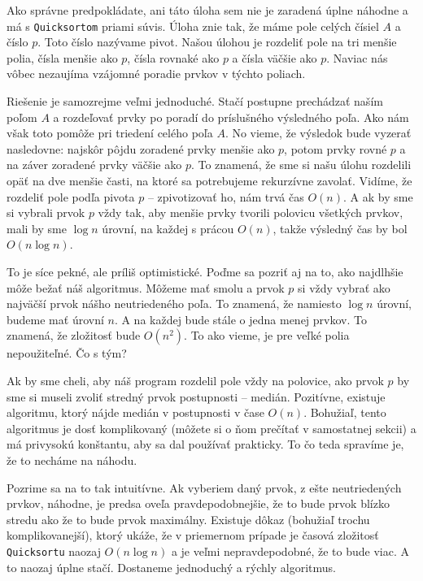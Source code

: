 Ako správne predpokládate, ani táto úloha sem nie je zaradená úplne náhodne a má s
\texttt{Quicksortom} priami súvis. Úloha znie tak, že máme pole celých čísiel $A$ a číslo $p$. Toto
číslo nazývame pivot. Našou úlohou je rozdeliť pole na tri menšie polia, čísla menšie ako $p$, čísla
rovnaké ako $p$ a čísla väčšie ako $p$. Naviac nás vôbec nezaujíma vzájomné poradie prvkov v týchto
poliach.

Riešenie je samozrejme veľmi jednoduché. Stačí postupne prechádzať naším poľom $A$ a rozdeľovať
prvky po poradí do príslušného výsledného poľa. Ako nám však toto pomôže pri triedení celého poľa
$A$. No vieme, že výsledok bude vyzerať nasledovne: najskôr pôjdu zoradené prvky menšie ako $p$,
potom prvky rovné $p$ a na záver zoradené prvky väčšie ako $p$. To znamená, že sme si našu úlohu
rozdelili opäť na dve menšie časti, na ktoré sa potrebujeme rekurzívne zavolať. Vidíme, že rozdeliť
pole podľa pivota $p$ -- zpivotizovať ho, nám trvá čas $O(n)$. A ak by sme si vybrali prvok $p$ vždy
tak, aby menšie prvky tvorili polovicu všetkých prvkov, mali by sme $\log n$ úrovní, na každej s
prácou $O(n)$, takže výsledný čas by bol $O(n \log n)$.

To je síce pekné, ale príliš optimistické. Poďme sa pozriť aj na to, ako najdlhšie môže bežať náš
algoritmus. Môžeme mať smolu a prvok $p$ si vždy vybrať ako najväčší prvok nášho neutriedeného poľa.
To znamená, že namiesto $\log n$ úrovní, budeme mať úrovní $n$. A na každej bude stále o jedna menej
prvkov. To znamená, že zložitosť bude $O(n^2)$. To ako vieme, je pre veľké polia nepoužiteľné. Čo s
tým?

Ak by sme cheli, aby náš program rozdelil pole vždy na polovice, ako prvok $p$ by sme si museli
zvoliť stredný prvok postupnosti -- medián. Pozitívne, existuje algoritmu, ktorý nájde medián v
postupnosti v čase $O(n)$. Bohužiaľ, tento algoritmus je dosť komplikovaný (môžete si o ňom prečítať
v samostatnej sekcii) a má privysokú konštantu, aby sa dal používať prakticky. To čo teda spravíme
je, že to necháme na náhodu.

Pozrime sa na to tak intuitívne. Ak vyberiem daný prvok, z ešte neutriedených prvkov, náhodne, je
predsa oveľa pravdepodobnejšie, že to bude prvok blízko stredu ako že to bude prvok maximálny.
Existuje dôkaz (bohužiaľ trochu komplikovanejší), ktorý ukáže, že v priemernom prípade je časová
zložitosť \texttt{Quicksortu} naozaj $O(n \log n)$ a je veľmi nepravdepodobné, že to bude viac. A to
naozaj úplne stačí. Dostaneme jednoduchý a rýchly algoritmus.

